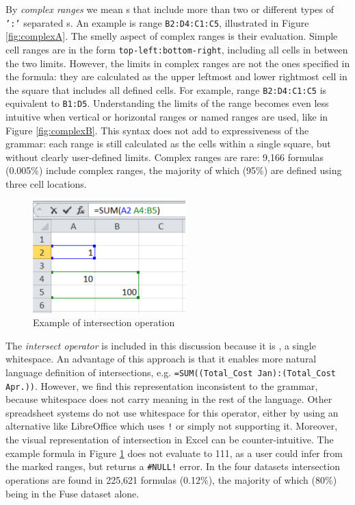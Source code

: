 \documentclass[times]{smrauth}
\begin{document}
By \textit{complex ranges} we mean s that include more than two or different types of \texttt{':'} separated s. An example is range \texttt{B2:D4:C1:C5}, illustrated in Figure \ref{fig:complexA}. The smelly aspect of complex ranges is their evaluation. Simple cell ranges are in the form \texttt{top-left:bottom-right}, including all cells in between the two limits. However, the limits in complex ranges are not the ones specified in the formula: they are calculated as the upper leftmost and lower rightmost cell in the square that includes all defined cells. For example, range \texttt{B2:D4:C1:C5} is equivalent to \texttt{B1:D5}. Understanding the limits of the range becomes even less intuitive when vertical or horizontal ranges or named ranges are used, like in Figure \ref{fig:complexB}. This syntax does not add to expressiveness of the grammar: each range is still calculated as the cells within a single square, but without clearly user-defined limits. Complex ranges are rare: 9,166 formulas (0.005\%) include complex ranges, the majority of which (95\%) are defined using three cell locations.

\begin{figure}
	\centering
	\includegraphics[]{img/intersection}
	\caption{Example of intersection operation}
	\label{Figure:intersection}
\end{figure}

The \textit{intersect operator} is included in this discussion because it is \texttt{}, a single whitespace.
An advantage of this approach is that it enables more natural language definition of intersections, e.g. \texttt{=SUM((Total_Cost Jan):(Total_Cost Apr.))}.
However, we find this representation inconsistent to the grammar, because whitespace does not carry meaning in the rest of the language. Other spreadsheet systems do not use whitespace for this operator, either by using an alternative like LibreOffice which uses \texttt{!} or simply not supporting it. Moreover, the visual representation of intersection in Excel can be counter-intuitive. The example formula in Figure \ref{Figure:intersection} does not evaluate to 111, as a user could infer from the marked ranges, but returns a \texttt{\#NULL!} error. In the four datasets intersection operations are found in 225,621	formulas (0.12\%), the majority of which (80\%) being in the Fuse dataset alone.
\end{document}
